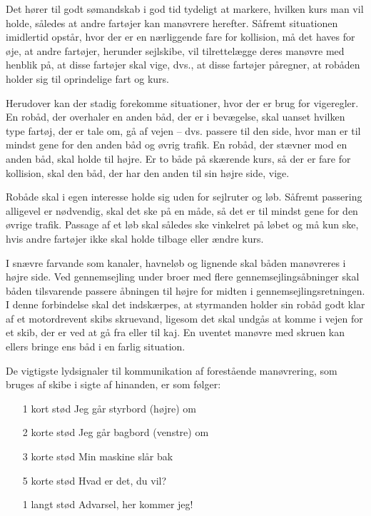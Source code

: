 \documentclass{article}
\begin{document}
Det hører til godt sømandskab i god tid tydeligt at markere, hvilken kurs
man vil holde, således at andre fartøjer kan manøvrere herefter. Såfremt
situationen imidlertid opstår, hvor der er en nærliggende fare for
kollision, må det haves for øje, at andre fartøjer, herunder sejlskibe,
vil tilrettelægge deres manøvre med henblik på, at disse fartøjer skal
vige, dvs., at disse fartøjer påregner, at robåden holder sig til
oprindelige fart og kurs.

Herudover kan der stadig forekomme situationer, hvor der er brug for
vigeregler. En robåd, der overhaler en anden båd, der er i bevægelse,
skal uanset hvilken type fartøj, der er tale om, gå af vejen – dvs.
passere til den side, hvor man er til mindst gene for den anden båd og
øvrig trafik. En robåd, der stævner mod en anden båd, skal holde til
højre. Er to både på skærende kurs, så der er fare for kollision, skal
den båd, der har den anden til sin højre side, vige.

Robåde skal i egen interesse holde sig uden for sejlruter og løb. Såfremt
passering alligevel er nødvendig, skal det ske på en måde, så det er til
mindst gene for den øvrige trafik. Passage af et løb skal således ske
vinkelret på løbet og må kun ske, hvis andre fartøjer ikke skal holde
tilbage eller ændre kurs.

I snævre farvande som kanaler, havneløb og lignende skal båden manøvreres
i højre side. Ved gennemsejling under broer med flere
gennemsejlingsåbninger skal båden tilsvarende passere åbningen til højre
for midten i gennemsejlingsretningen. I denne forbindelse skal det
indskærpes, at styrmanden holder sin robåd godt klar af et motordrevent
skibs skruevand, ligesom det skal undgås at komme i vejen for et skib,
der er ved at gå fra eller til kaj. En uventet manøvre med skruen kan
ellers bringe ens båd i en farlig situation.

De vigtigste lydsignaler til kommunikation af forestående manøvrering,
som bruges af skibe i sigte af hinanden, er som følger:

\begin{itemize}
    \item[1 kort stød] Jeg går styrbord (højre) om
    \item[2 korte stød] Jeg går bagbord (venstre) om
    \item[3 korte stød] Min maskine slår bak
    \item[5 korte stød] Hvad er det, du vil?
    \item[1 langt stød] Advarsel, her kommer jeg!
\end{itemize}
\end{document}
